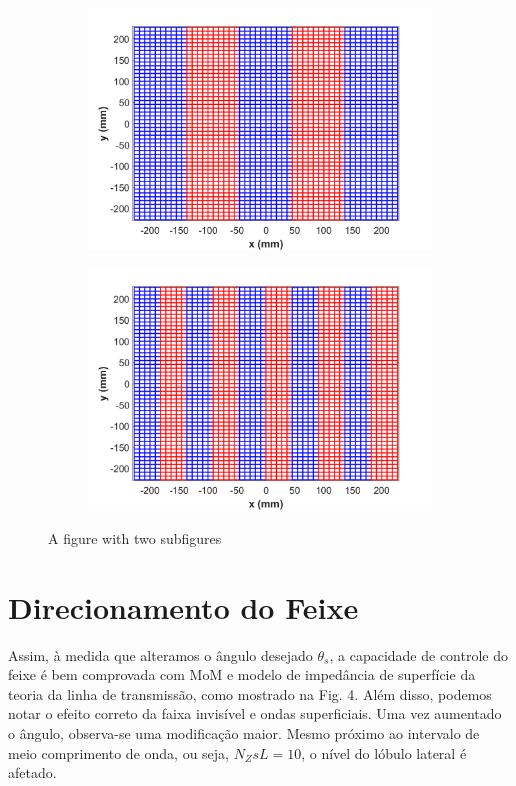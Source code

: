 \documentclass[
	12pt,				%
	openright,			%
	oneside,			%
	a4paper,			%
	english,			%
	brazil				%
	]{abntex2}
\begin{document}
\begin{figure}
\centering
\begin{subfigure}{.5\textwidth}
  \centering
  \includegraphics[width=\textwidth]{figures/MeshDiscretization5.png}
  \label{fig:sub1}
\end{subfigure}%
\begin{subfigure}{.5\textwidth}
  \centering
  \includegraphics[width=\textwidth]{figures/MeshDiscretization10.png}
  \label{fig:sub2}
\end{subfigure}
\caption{A figure with two subfigures}
\label{fig:test}
\end{figure}

\section{Direcionamento do Feixe}
Assim, à medida que alteramos o ângulo desejado $θ_s$, a capacidade de controle do feixe é bem comprovada com MoM e modelo de impedância de superfície da teoria da linha de transmissão, como mostrado na Fig. 4. Além disso, podemos notar o efeito correto da faixa invisível e ondas superficiais. Uma vez aumentado o ângulo, observa-se uma modificação maior. Mesmo próximo ao intervalo de meio comprimento de onda, ou seja, $N_ZsL=10$, o nível do lóbulo lateral é afetado.
\end{document}
